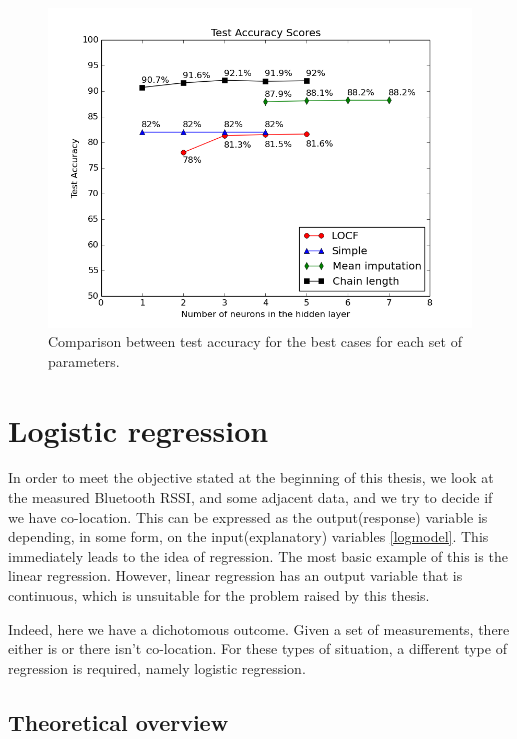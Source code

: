 \begin{figure}[h]
	\begin{center}
		\includegraphics[scale=0.6]{figures/ann_total.png}
	\end{center}
	
	\caption{Comparison between test accuracy for the best cases for each set of parameters.}
	\label{pic:ann_total}

\end{figure}
     

\section{Logistic regression}

In order to meet the objective stated at the beginning of this thesis, we look at the measured Bluetooth RSSI, and some adjacent data, and we try to decide if we have co-location. This can be expressed as the output(response) variable is depending, in some form, on the input(explanatory) variables  \ref{logmodel}. This immediately leads to the idea of regression. The most basic example of this is the linear regression. However, linear regression has an output variable that is continuous, which is unsuitable for the problem raised by this thesis.

Indeed, here we have a dichotomous outcome. Given a set of measurements, there either is or there isn't co-location. For these types of situation, a different type of regression is required, namely logistic regression. 

\subsection{Theoretical overview}

